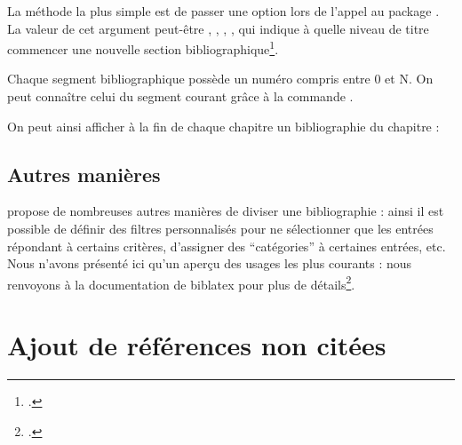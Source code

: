 La méthode la plus simple est de passer une option  lors de l'appel au package . La valeur de cet argument peut-être , , , , qui indique à quelle niveau de titre commencer une nouvelle section bibliographique\footcite[Il est toutefois possible de créer des sections bibliographiques autrement que suivant les niveaux de titre, voir :][]{biblatex_segment}.

Chaque segment bibliographique possède un numéro compris entre 0 et N. On peut connaître celui du segment courant grâce à la commande .

On peut ainsi afficher à la fin de chaque chapitre un bibliographie du chapitre :


\subsection{Autres manières}

 propose de nombreuses autres manières de diviser une bibliographie : ainsi il est possible de définir des filtres personnalisés pour ne sélectionner que les entrées répondant à certains critères, d'assigner des \enquote{catégories} à certaines entrées, etc. Nous n'avons présenté ici qu'un aperçu des usages les plus courants : nous renvoyons à la documentation de biblatex pour plus de détails\footcite{biblatex_bibliographycommands}.

\section{Ajout de références non citées}

